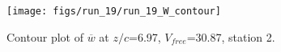 \begin{figure}[H]
\centering
\texttt{[image: figs/run\_19/run\_19\_W\_contour]}
\caption{Contour plot of $\overline{w}$ at $z/c$=6.97, $V_{free}$=30.87, station 2.}
\label{fig:run_19_W_contour}
\end{figure}


